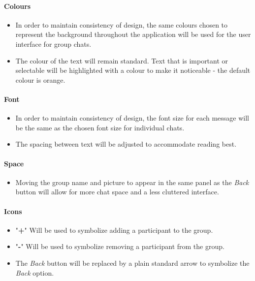 \documentclass[11pt]{article}
\begin{document}
\paragraph{Colours}
\begin{itemize}
\item	In order to maintain consistency of design, the same colours chosen to represent the background throughout the application will be used for the user interface for group chats.
\item	The colour of the text will remain standard. Text that is important or selectable will be highlighted with a colour to make it noticeable - the default colour is orange. 	\\
\end{itemize}

\paragraph{Font}
\begin{itemize}
\item	In order to maintain consistency of design, the font size for each message will be the same as the chosen font size for individual chats.
\item The spacing between text will be adjusted to accommodate reading best.\\
\end{itemize}

\paragraph{Space}
\begin{itemize}
\item	Moving the group name and picture to appear in the same panel as the \textit{Back} button will allow for more chat space and a less cluttered interface.
\end{itemize}

\paragraph{Icons}
\begin{itemize}
\item	"\textbf{+}" Will be used to symbolize adding a participant to the group.  
\item "\textbf{-}" Will be used to symbolize removing a participant from the group.
\item The \textit{Back} button will be replaced by a plain standard arrow to symbolize the \textit{Back} option.  
\end{itemize}
\end{document}
